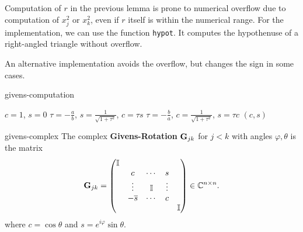 \begin{remark}
  Computation of $r$ in the previous lemma is prone to numerical
  overflow due to computation of $x_j^2$ or $x_k^2$, even if $r$
  itself is within the numerical range. For the implementation, we can
  use the function \lstinline!hypot!. It computes the hypothenuse of a
  right-angled triangle without overflow.

  An alternative implementation avoids the overflow, but changes the
  sign in some cases.
\end{remark}

\begin{Algorithm}{givens-computation}
  \begin{algorithmic}[1]
    \State $c=1$, $s=0$
    \Else
    \State $\tau=-\frac ab$, $s=\frac1{\sqrt{1+\tau^2}}$, $c=\tau s$
    \Else
    \State $\tau=-\frac ba$, $c=\frac1{\sqrt{1+\tau^2}}$, $s=\tau c$
    \EndIf
    \EndIf
    \State \Return $(c,s)$
    \EndFunction
  \end{algorithmic}
\end{Algorithm}

\begin{Definition}{givens-complex}
  The complex \textbf{Givens-Rotation} $\mathbf G_{jk}$ for $j<k$ with angles $\varphi,\theta$ is the matrix
  \begin{gather}
      \mathbf G_{jk} =
    \begin{pmatrix}
      \mathbb I \\
      &c&\cdots&s\\
      &\vdots&\mathbb I &\vdots\\
      &-\overline s&\cdots&c\\
      &&&&\mathbb I
    \end{pmatrix}
    \in\mathbb C^{n\times n}.
  \end{gather}
    where $c = \cos\theta$ and $s = e^{i\varphi}\sin\theta$.
\end{Definition}

